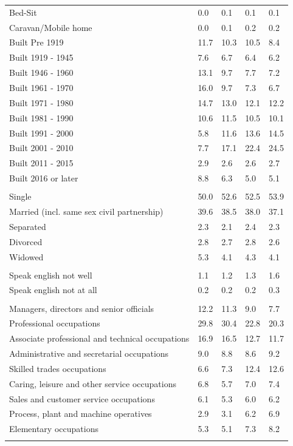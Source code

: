 \documentclass{article}
\begin{document}
\begin{table}[h]
\begin{tabular}{KTTTT}
Bed-Sit & 0.0& 0.1& 0.1& 0.1\\
Caravan/Mobile home & 0.0& 0.1& 0.2& 0.2\\
    \hline
Built Pre 1919 & 11.7& 10.3& 10.5&  8.4\\
Built 1919 - 1945 & 7.6& 6.7& 6.4& 6.2\\
Built  1946 - 1960 & 13.1&  9.7&  7.7&  7.2\\
Built  1961 - 1970 & 16.0&  9.7&  7.3&  6.7\\
Built  1971 - 1980 & 14.7& 13.0& 12.1& 12.2\\
Built  1981 - 1990 & 10.6& 11.5& 10.5& 10.1\\
Built  1991 - 2000 &  5.8& 11.6& 13.6& 14.5\\
Built  2001 - 2010 &  7.7& 17.1& 22.4& 24.5\\
Built  2011 - 2015 & 2.9& 2.6& 2.6& 2.7\\
Built  2016 or later & 8.8& 6.3& 5.0& 5.1\\
\hline
    \\
    \hline
Single & 50.0& 52.6& 52.5& 53.9\\
Married (incl. same sex civil partnership) & 39.6& 38.5& 38.0& 37.1\\
Separated  & 2.3& 2.1& 2.4& 2.3\\
Divorced  & 2.8& 2.7& 2.8& 2.6\\
Widowed & 5.3& 4.1& 4.3& 4.1\\
\hline
    \\ 
    \hline
Speak english not well & 1.1& 1.2& 1.3& 1.6\\
Speak english not at all & 0.2& 0.2& 0.2& 0.3\\
\hline
    \\
    \hline
Managers, directors and senior officials & 12.2& 11.3&  9.0&  7.7\\
Professional occupations & 29.8& 30.4& 22.8& 20.3\\
Associate professional and technical occupations & 16.9& 16.5& 12.7& 11.7\\
Administrative and secretarial occupations & 9.0& 8.8& 8.6& 9.2\\
Skilled trades occupations &  6.6&  7.3& 12.4& 12.6\\
Caring, leisure and other service occupations & 6.8& 5.7& 7.0& 7.4\\
Sales and customer service occupations & 6.1& 5.3& 6.0& 6.2\\
Process, plant and machine operatives & 2.9& 3.1& 6.2& 6.9\\
Elementary occupations & 5.3& 5.1& 7.3& 8.2\\
\hline
\end{tabular}
\end{table}
\end{document}
